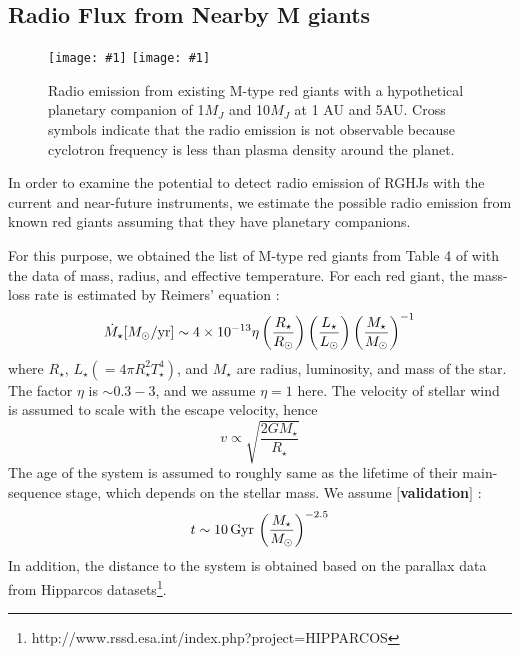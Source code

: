 \documentclass{emulateapj}
\def\memoYF#1{\color{red}$[${\bf #1}$]$ \color{black}}
\def\plotoneh#1{\centering \leavevmode
\texttt{[image: \#1]}}
\begin{document}
\subsection{Radio Flux from Nearby M giants}
\label{ss:actualMgiants}

\begin{figure}[tbhp]
   \plotoneh{radio_1Mp.pdf}
   \plotoneh{radio_10Mp.pdf}
   \caption{Radio emission from existing M-type red giants with a hypothetical planetary companion of 1$M_J$ and 10$M_J$ at 1 AU and 5AU. Cross symbols indicate that the radio emission is not observable because cyclotron frequency is less than plasma density around the planet. }
  \label{fig:observability}
\end{figure}

In order to examine the potential to detect radio emission of RGHJs with the current and near-future instruments, we estimate the possible radio emission from known red giants assuming that they have planetary companions. 

For this purpose, we obtained the list of M-type red giants from Table 4 of \citet{dumm1998} with the data of mass, radius, and effective temperature.
For each red giant, the mass-loss rate is estimated by Reimers' equation \citep{reimers1975}:
\begin{equation}
\dot M_\star [M_\odot{\rm /yr}] \sim 4 \times 10^{-13} \eta \left( \frac{R_{\star }}{R_{\odot }} \right)\left( \frac{L_{\star }}{L_{\odot }} \right) \left( \frac{M_\star}{M_\odot} \right)^{-1}
\end{equation}
where $R_{\star }$, $L_{\star } (=4\pi R_{\star }^2 T_{\star }^4)$, and $M_{\star}$ are radius, luminosity, and mass of the star. 
The factor $\eta $ is $\sim 0.3-3$, and we assume $\eta =1$ here. 
The velocity of stellar wind is assumed to scale with the escape velocity, hence
\begin{equation}
v \propto \sqrt{\frac{2GM_\star}{R_{\star }}}
\end{equation}
The age of the system is assumed to roughly same as the lifetime of their main-sequence stage, which depends on the stellar mass. We assume \memoYF{validation}:
\begin{equation}
t \sim 10\,{\rm Gyr}\, \left( \frac{M_{\star}}{M_{\odot }} \right)^{-2.5}
\end{equation}
In addition, the distance to the system is obtained based on the parallax data from Hipparcos datasets\footnote{http://www.rssd.esa.int/index.php?project=HIPPARCOS}. 
\end{document}
